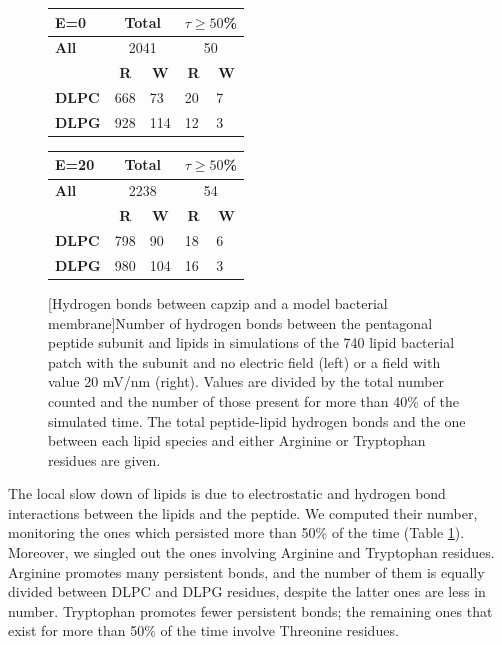 \begin{figure}[t!]
\centering
 \def\arraystretch{1.6}
\begin{tabular}{l|ll|ll}
\hline
\textbf{E=0} & \multicolumn{2}{c|}{Total} & \multicolumn{2}{c}{$\displaystyle\tau \ge 50$\%} \\
\hline
\textbf{All} & \multicolumn{2}{c|}{2041} & \multicolumn{2}{c}{50} \\
\hline
\hline
  & \multicolumn{1}{c}{\textbf{R}} & \multicolumn{1}{c|}{\textbf{W}} & \multicolumn{1}{c}{\textbf{R}} & \multicolumn{1}{c}{\textbf{W}} \\
 \hline
 \textbf{DLPC} & 668 & 73 & 20 & 7 \\
 \textbf{DLPG} & 928 & 114 & 12 & 3 \\
 \hline
 \end{tabular}
 \hspace{0.4cm}
 \begin{tabular}{l|ll|ll}
 \hline
\textbf{E=20} & \multicolumn{2}{c|}{Total} & \multicolumn{2}{c}{$\displaystyle\tau \ge 50$\%} \\
\hline
\textbf{All} & \multicolumn{2}{c|}{2238} & \multicolumn{2}{c}{54} \\
\hline
\hline
 & \multicolumn{1}{c}{\textbf{R}} & \multicolumn{1}{c|}{\textbf{W}} & \multicolumn{1}{c}{\textbf{R}} & \multicolumn{1}{c}{\textbf{W}} \\
 \hline
 \textbf{DLPC} & 798 & 90 & 18 & 6 \\
 \textbf{DLPG} & 980 & 104 & 16 & 3 \\
 \hline
 \end{tabular}
[Hydrogen bonds between capzip and a model bacterial membrane]{Number of hydrogen bonds between the pentagonal peptide subunit and lipids in simulations of the 740 lipid bacterial patch with the subunit and no electric field (left) or a field with value 20 mV/nm (right). Values are divided by the total number counted and the number of those present for more than 40\% of the simulated time. The total peptide-lipid hydrogen bonds and the one between each lipid species and either Arginine or Tryptophan residues are given.}
\label{table:hb_pr_lip}
\end{figure}

The local slow down of lipids is due to electrostatic and hydrogen bond interactions between the lipids and the peptide. We computed their number, monitoring the ones which persisted more than 50\% of the time (Table \ref{table:hb_pr_lip}). Moreover, we singled out the ones involving Arginine and Tryptophan residues.
%
Arginine promotes many persistent bonds, and the number of them is equally divided between DLPC and DLPG residues, despite the latter ones are less in number. Tryptophan promotes fewer persistent bonds; the remaining ones that exist for more than 50\% of the time involve Threonine residues.
%

